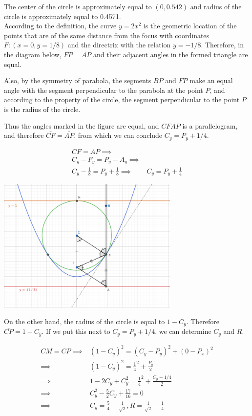 \begin{solution}
The center of the circle is approximately equal to $(0,0.542)$ and radius of the circle is approximately equal to 0.4571.\\[0.2cm]

According to the definition, the curve $y=2x^2$ is the geometric location of the points that are of the same distance from the focus with coordinates $F: (x=0, y=1/8)$ and the directrix with the relation $y=-1/8$.
Therefore, in the diagram below, $\bar{FP}=\bar{AP}$ and their adjacent angles in the formed triangle are equal.

Also, by the symmetry of parabola, the segments $BP$ and $FP$ make an equal angle with the segment perpendicular to the parabola at the point $P$, and according to the property of the circle, the segment perpendicular to the point $P$ is the radius of the circle.

Thus the angles marked in the figure are equal, and $CFAP$ is a parallelogram, and therefore $\bar{CF}=\bar{AP}$, from which we can conclude $C_y=P_y+1/4$.

$$\begin{aligned}
CF = AP \implies& \\
C_y - F_y = P_y - A_y \implies& \\
C_y - \frac{1}{8} = P_y + \frac{1}{8} \implies& C_y=P_y+\frac{1}{4}
\end{aligned}$$

\begin{center}
	\includegraphics[width=9cm]{41/figs/41_diagram0.png}
\end{center}

On the other hand, the radius of the circle is equal to $1-C_y$. Therefore $\bar{CP}=1-C_y$. If we put this next to $C_y=P_y+1/4$, we can determine $C_y$ and $R$.

$$\begin{aligned}
CM = CP \implies& (1 - C_y)^2 = (C_y - P_y)^2 + (0 - P_x)^2 \\
\implies& (1 - C_y)^2 = \frac{1}{4}^2 + \frac{P_y}{2} \\
\implies& 1 - 2C_y + C_y^2  = \frac{1}{4}^2 + \frac{C_y-1/4}{2} \\
\implies& C_y^2 - \frac{5}{2}C_y + \frac{17}{16} = 0 \\
\implies& C_y = \frac{5}{4} - \frac{1}{\sqrt{2}}, R = \frac{1}{\sqrt{2}} - \frac{1}{4}
\end{aligned}$$

\end{solution}